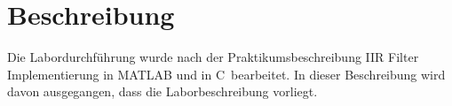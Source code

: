 \section{Beschreibung}
Die Labordurchführung wurde nach der Praktikumsbeschreibung \glqq IIR Filter Implementierung in MATLAB und in C\grqq~bearbeitet. In dieser Beschreibung wird davon ausgegangen, dass die Laborbeschreibung vorliegt.\\


